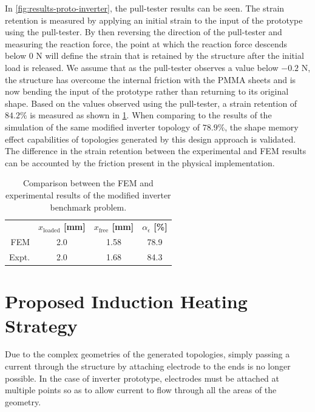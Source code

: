 In \cref{fig:results-proto-inverter}, the pull-tester results can be seen. The strain retention is measured by applying an initial strain to the input of the prototype using the pull-tester. By then reversing the direction of the pull-tester and measuring the reaction force, the point at which the reaction force descends below $0$ N will define the strain that is retained by the structure after the initial load is released. We assume that as the pull-tester observes a value below $-0.2$ N, the structure has overcome the internal friction with the PMMA sheets and is now bending the input of the prototype rather than returning to its original shape. Based on the values observed using the pull-tester, a strain retention of $84.2$\% is measured as shown in \cref{tab:inverter-prototype-fem-results}. When comparing to the results of the simulation of the same modified inverter topology of $78.9$\%, the shape memory effect capabilities of topologies generated by this design approach is validated. The difference in the strain retention between the experimental and FEM results can be accounted by the friction present in the physical implementation.

\begin{table}[hbt!]
    \centering
    \caption{Comparison between the FEM and experimental results of the modified inverter benchmark problem.}
    \label{tab:inverter-prototype-fem-results}
    {
     \begin{tabular}{r c c c}
     \rowcolor{black} & \textbf{\color{white} $x_\text{loaded}$ [mm]}  & \textbf{\color{white} $x_\text{free}$ [mm]} & \textbf{\color{white} $\alpha_\epsilon$ [\%]}\\
     FEM & 2.0 & 1.58 & 78.9 \\
     Expt. & 2.0 & 1.68 & 84.3 \\
 \end{tabular}}
\end{table}

\section{Proposed Induction Heating Strategy}
Due to the complex geometries of the generated topologies, simply passing a current through the structure by attaching electrode to the ends is no longer possible. In the case of inverter prototype, electrodes must be attached at multiple points so as to allow current to flow through all the areas of the geometry.

